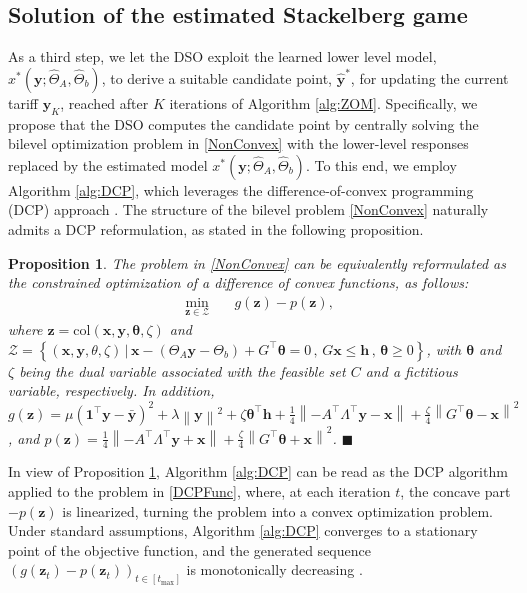 \documentclass[letterpaper, 10 pt, conference]{ieeeconf}
\newcommand\xbf{\mathbf{x}}
\newcommand\ybf{\mathbf{y}}
\newcommand\zbf{\mathbf{z}}
\newtheorem{proposition}{Proposition}
\begin{document}
\subsection{Solution of the estimated Stackelberg game}
As a third step, we let the DSO exploit the learned lower level model, $x^*(\ybf; \hat{\Theta}_A, \hat{\Theta}_b)$, to derive a suitable candidate point, $\hat{\ybf}^*$, for updating the current tariff $\ybf_K$, reached after $K$ iterations of Algorithm \ref{alg:ZOM}. Specifically, we propose that the DSO computes the candidate point by centrally solving the bilevel optimization problem in \eqref{NonConvex} with the lower-level responses replaced by the estimated model $x^*(\ybf;\hat{\Theta}_A, \hat{\Theta}_b)$. To this end, we employ Algorithm \ref{alg:DCP}, which leverages the difference-of-convex programming (DCP) approach \cite{tao1997convex}. The structure of the bilevel problem \eqref{NonConvex} naturally admits a DCP reformulation, as stated in the following proposition.
\begin{proposition}\label{DCPRef}
    The problem in \eqref{NonConvex} can be equivalently reformulated as the constrained optimization of a difference of convex functions, as follows:
    \begin{align}\label{DCPFunc}
        \min\limits_{\zbf \in \mathcal{Z}}\quad & g(\zbf)-p(\zbf),
    \end{align}
    where $\zbf=\mathrm{col}\left(\xbf, \ybf, \mathbf{\theta}, \zeta\right)$ and $\mathcal{Z}=\left\{(\xbf,\ybf,\theta,\zeta)\,|\,\xbf-(\Theta_A \ybf-\Theta_b)+G^\top \mathbf{\theta}=0 \,, \, G \xbf \le \mathbf{h} \,, \, \mathbf{\theta} \ge 0 \right\}$, with $\mathbf{\theta}$ and $\zeta$ being the dual variable associated with the feasible set $C$ and a fictitious variable, respectively. In addition, $g(\zbf)=\mu (\mathbf{1}^\top\ybf-\bar{\ybf})^2+\lambda \left\|\ybf\right\|^2 + \zeta \mathbf{\theta}^\top\mathbf{h}+\frac{1}{4} \left\|-A^\top \Lambda^\top \ybf - \xbf \right\|+ \frac{\zeta}{4} \left\|G^\top \mathbf{\theta} - \xbf\right\|^2$, and $p(\zbf)= \frac{1}{4} \left\|-A^\top \Lambda^\top \ybf + \xbf \right\|+ \frac{\zeta}{4} \left\|G^\top \mathbf{\theta} + \xbf\right\|^2$. \hfill $\blacksquare$
\end{proposition}
 In view of Proposition \ref{DCPRef}, Algorithm \ref{alg:DCP} can be read as the DCP algorithm applied to the problem in \eqref{DCPFunc}, where, at each iteration $t$, the concave part $-p(\zbf)$ is linearized, turning the problem into a convex optimization problem. Under standard assumptions, Algorithm \ref{alg:DCP} converges to a stationary point of the objective function, and the generated sequence $\left(g(\zbf_t)-p(\zbf_t)\right)_{t \in [t_{\max}]}$ is monotonically decreasing \cite[Theorem 3]{tao1997convex}.
\end{document}
